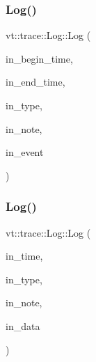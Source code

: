 \subsubsection{\texorpdfstring{Log()}{Log()}\hspace{0.1cm}{\footnotesize\ttfamily [4/11]}}
{\footnotesize\ttfamily vt\+::trace\+::\+Log\+::\+Log (\begin{DoxyParamCaption}\item[{\hyperlink{namespacevt_a2b9f28078dc309ad0706b69ded743e69}{Time\+Type} const}]{in\+\_\+begin\+\_\+time,  }\item[{\hyperlink{namespacevt_a2b9f28078dc309ad0706b69ded743e69}{Time\+Type} const}]{in\+\_\+end\+\_\+time,  }\item[{\hyperlink{namespacevt_1_1trace_acf454dfbd581b0ebae895f90b5927a1d}{Trace\+Constants\+Type} const}]{in\+\_\+type,  }\item[{std\+::string const \&}]{in\+\_\+note,  }\item[{\hyperlink{namespacevt_1_1trace_a64a7185f3e102df8d8258f263ccd1582}{Trace\+Event\+I\+D\+Type} const}]{in\+\_\+event }\end{DoxyParamCaption})\hspace{0.3cm}{\ttfamily [inline]}}

\mbox{\label{structvt_1_1trace_1_1_log_a03d5c5f06a5069379636e04202648b08}} 
\subsubsection{\texorpdfstring{Log()}{Log()}\hspace{0.1cm}{\footnotesize\ttfamily [5/11]}}
{\footnotesize\ttfamily vt\+::trace\+::\+Log\+::\+Log (\begin{DoxyParamCaption}\item[{\hyperlink{namespacevt_a2b9f28078dc309ad0706b69ded743e69}{Time\+Type} const}]{in\+\_\+time,  }\item[{\hyperlink{namespacevt_1_1trace_acf454dfbd581b0ebae895f90b5927a1d}{Trace\+Constants\+Type} const}]{in\+\_\+type,  }\item[{std\+::string const \&}]{in\+\_\+note,  }\item[{\mbox{[}\mbox{[}maybe\+\_\+unused\mbox{]} \mbox{]} \hyperlink{structvt_1_1trace_1_1_log_af392c3825bf45d286a0f77bddf7a96cf}{User\+Data\+Type}}]{in\+\_\+data }\end{DoxyParamCaption})\hspace{0.3cm}{\ttfamily [inline]}}

